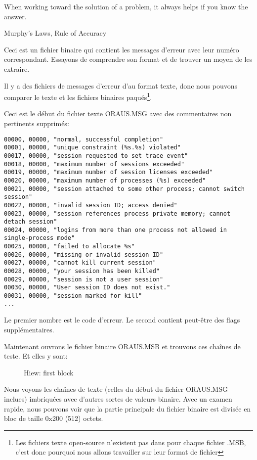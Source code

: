 \myindex{\oracle}
\epigraph{When working toward the solution of a problem, it always helps if you know the answer.}{Murphy's Laws, Rule of Accuracy}

Ceci est un fichier binaire qui contient les messages d'erreur avec leur numéro
correspondant.
Essayons de comprendre son format et de trouver un moyen de les extraire.

Il y a des fichiers de messages d'erreur d'\oracle au format texte,
donc nous pouvons comparer le texte et les fichiers binaires paqués\footnote{Les
fichiers texte open-source n'existent pas dans \oracle pour chaque fichier .MSB,
c'est donc pourquoi nous allons travailler sur leur format de fichier}.

Ceci est le début du fichier texte ORAUS.MSG avec des commentaires non pertinents
supprimés:

\begin{lstlisting}[caption=Beginning of ORAUS.MSG file without comments]
00000, 00000, "normal, successful completion"
00001, 00000, "unique constraint (%s.%s) violated"
00017, 00000, "session requested to set trace event"
00018, 00000, "maximum number of sessions exceeded"
00019, 00000, "maximum number of session licenses exceeded"
00020, 00000, "maximum number of processes (%s) exceeded"
00021, 00000, "session attached to some other process; cannot switch session"
00022, 00000, "invalid session ID; access denied"
00023, 00000, "session references process private memory; cannot detach session"
00024, 00000, "logins from more than one process not allowed in single-process mode"
00025, 00000, "failed to allocate %s"
00026, 00000, "missing or invalid session ID"
00027, 00000, "cannot kill current session"
00028, 00000, "your session has been killed"
00029, 00000, "session is not a user session"
00030, 00000, "User session ID does not exist."
00031, 00000, "session marked for kill"
...
\end{lstlisting}

Le premier nombre est le code d'erreur.
Le second contient peut-être des flags supplémentaires.

\clearpage
Maintenant ouvrons le fichier binaire ORAUS.MSB et trouvons ces chaînes de teste.
Et elles y sont:

\begin{figure}[H]
\centering
{}
\caption{Hiew: first block}
\label{fig:oracle_MSB_1}
\end{figure}

Nous voyons les chaînes de texte (celles du début du fichier ORAUS.MSG inclues)
imbriquées avec d'autres sortes de valeurs binaire.
Avec un examen rapide, nous pouvons voir que la partie principale du fichier
binaire est divisée en bloc de taille 0x200 (512) octets.

